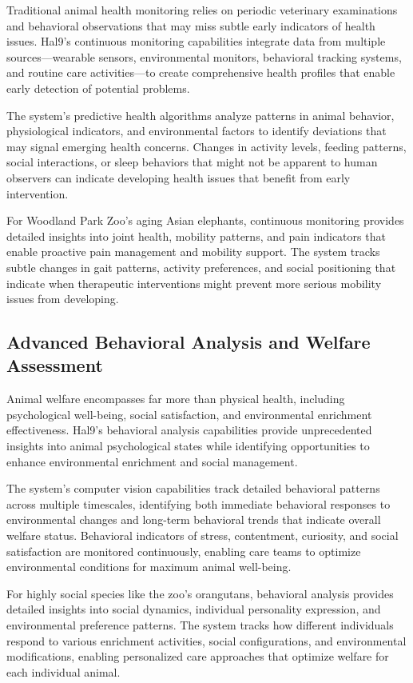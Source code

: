 \documentclass[
  Letterpaper,
]{scrbook}
\begin{document}
Traditional animal health monitoring relies on periodic veterinary
examinations and behavioral observations that may miss subtle early
indicators of health issues. Hal9's continuous monitoring capabilities
integrate data from multiple sources---wearable sensors, environmental
monitors, behavioral tracking systems, and routine care activities---to
create comprehensive health profiles that enable early detection of
potential problems.

The system's predictive health algorithms analyze patterns in animal
behavior, physiological indicators, and environmental factors to
identify deviations that may signal emerging health concerns. Changes in
activity levels, feeding patterns, social interactions, or sleep
behaviors that might not be apparent to human observers can indicate
developing health issues that benefit from early intervention.

For Woodland Park Zoo's aging Asian elephants, continuous monitoring
provides detailed insights into joint health, mobility patterns, and
pain indicators that enable proactive pain management and mobility
support. The system tracks subtle changes in gait patterns, activity
preferences, and social positioning that indicate when therapeutic
interventions might prevent more serious mobility issues from
developing.

\subsection{Advanced Behavioral Analysis and Welfare
Assessment}\label{advanced-behavioral-analysis-and-welfare-assessment}

Animal welfare encompasses far more than physical health, including
psychological well-being, social satisfaction, and environmental
enrichment effectiveness. Hal9's behavioral analysis capabilities
provide unprecedented insights into animal psychological states while
identifying opportunities to enhance environmental enrichment and social
management.

The system's computer vision capabilities track detailed behavioral
patterns across multiple timescales, identifying both immediate
behavioral responses to environmental changes and long-term behavioral
trends that indicate overall welfare status. Behavioral indicators of
stress, contentment, curiosity, and social satisfaction are monitored
continuously, enabling care teams to optimize environmental conditions
for maximum animal well-being.

For highly social species like the zoo's orangutans, behavioral analysis
provides detailed insights into social dynamics, individual personality
expression, and environmental preference patterns. The system tracks how
different individuals respond to various enrichment activities, social
configurations, and environmental modifications, enabling personalized
care approaches that optimize welfare for each individual animal.
\end{document}
